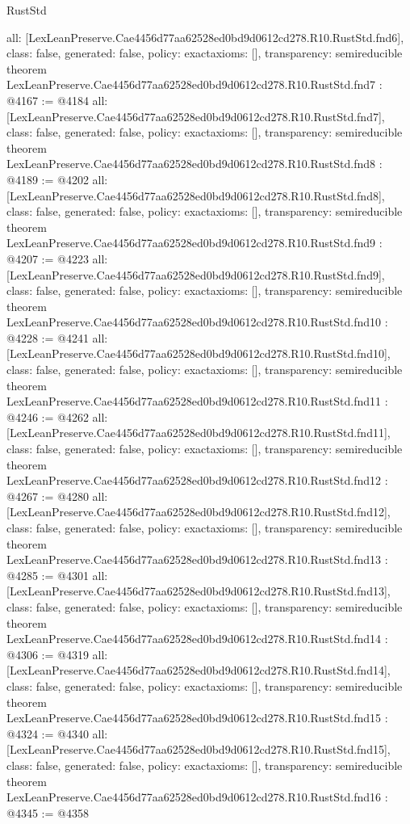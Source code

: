\begin{lexlean}{RustStd}
\begin{coremodule}
{  all: [LexLeanPreserve.Cae4456d77aa62528ed0bd9d0612cd278.R10.RustStd.fnd6],
  class: false,
  generated: false,
  policy: exact{axioms: []},
  transparency: semireducible
}
theorem LexLeanPreserve.Cae4456d77aa62528ed0bd9d0612cd278.R10.RustStd.fnd7 : @4167 := @4184 {
  all: [LexLeanPreserve.Cae4456d77aa62528ed0bd9d0612cd278.R10.RustStd.fnd7],
  class: false,
  generated: false,
  policy: exact{axioms: []},
  transparency: semireducible
}
theorem LexLeanPreserve.Cae4456d77aa62528ed0bd9d0612cd278.R10.RustStd.fnd8 : @4189 := @4202 {
  all: [LexLeanPreserve.Cae4456d77aa62528ed0bd9d0612cd278.R10.RustStd.fnd8],
  class: false,
  generated: false,
  policy: exact{axioms: []},
  transparency: semireducible
}
theorem LexLeanPreserve.Cae4456d77aa62528ed0bd9d0612cd278.R10.RustStd.fnd9 : @4207 := @4223 {
  all: [LexLeanPreserve.Cae4456d77aa62528ed0bd9d0612cd278.R10.RustStd.fnd9],
  class: false,
  generated: false,
  policy: exact{axioms: []},
  transparency: semireducible
}
theorem LexLeanPreserve.Cae4456d77aa62528ed0bd9d0612cd278.R10.RustStd.fnd10 : @4228 := @4241 {
  all: [LexLeanPreserve.Cae4456d77aa62528ed0bd9d0612cd278.R10.RustStd.fnd10],
  class: false,
  generated: false,
  policy: exact{axioms: []},
  transparency: semireducible
}
theorem LexLeanPreserve.Cae4456d77aa62528ed0bd9d0612cd278.R10.RustStd.fnd11 : @4246 := @4262 {
  all: [LexLeanPreserve.Cae4456d77aa62528ed0bd9d0612cd278.R10.RustStd.fnd11],
  class: false,
  generated: false,
  policy: exact{axioms: []},
  transparency: semireducible
}
theorem LexLeanPreserve.Cae4456d77aa62528ed0bd9d0612cd278.R10.RustStd.fnd12 : @4267 := @4280 {
  all: [LexLeanPreserve.Cae4456d77aa62528ed0bd9d0612cd278.R10.RustStd.fnd12],
  class: false,
  generated: false,
  policy: exact{axioms: []},
  transparency: semireducible
}
theorem LexLeanPreserve.Cae4456d77aa62528ed0bd9d0612cd278.R10.RustStd.fnd13 : @4285 := @4301 {
  all: [LexLeanPreserve.Cae4456d77aa62528ed0bd9d0612cd278.R10.RustStd.fnd13],
  class: false,
  generated: false,
  policy: exact{axioms: []},
  transparency: semireducible
}
theorem LexLeanPreserve.Cae4456d77aa62528ed0bd9d0612cd278.R10.RustStd.fnd14 : @4306 := @4319 {
  all: [LexLeanPreserve.Cae4456d77aa62528ed0bd9d0612cd278.R10.RustStd.fnd14],
  class: false,
  generated: false,
  policy: exact{axioms: []},
  transparency: semireducible
}
theorem LexLeanPreserve.Cae4456d77aa62528ed0bd9d0612cd278.R10.RustStd.fnd15 : @4324 := @4340 {
  all: [LexLeanPreserve.Cae4456d77aa62528ed0bd9d0612cd278.R10.RustStd.fnd15],
  class: false,
  generated: false,
  policy: exact{axioms: []},
  transparency: semireducible
}
theorem LexLeanPreserve.Cae4456d77aa62528ed0bd9d0612cd278.R10.RustStd.fnd16 : @4345 := @4358 {
}
\end{coremodule}
\end{lexlean}
